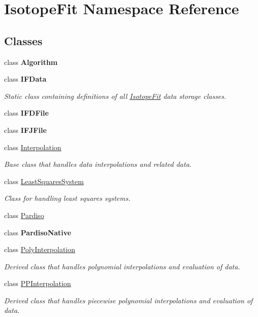 \hypertarget{namespace_isotope_fit}{}\section{Isotope\+Fit Namespace Reference}
\label{namespace_isotope_fit}
\subsection*{Classes}
\begin{DoxyCompactItemize}
\item 
class {\bfseries Algorithm}
\item 
class {\bfseries I\+F\+Data}
\begin{DoxyCompactList}\small\item\em Static class containing definitions of all \hyperlink{namespace_isotope_fit}{Isotope\+Fit} data storage classes. \end{DoxyCompactList}\item 
class {\bfseries I\+F\+D\+File}
\item 
class {\bfseries I\+F\+J\+File}
\item 
class \hyperlink{class_isotope_fit_1_1_interpolation}{Interpolation}
\begin{DoxyCompactList}\small\item\em Base class that handles data interpolations and related data. \end{DoxyCompactList}\item 
class \hyperlink{class_isotope_fit_1_1_least_squares_system}{Least\+Squares\+System}
\begin{DoxyCompactList}\small\item\em Class for handling least squares systems. \end{DoxyCompactList}\item 
class \hyperlink{class_isotope_fit_1_1_pardiso}{Pardiso}
\item 
class {\bfseries Pardiso\+Native}
\item 
class \hyperlink{class_isotope_fit_1_1_poly_interpolation}{Poly\+Interpolation}
\begin{DoxyCompactList}\small\item\em Derived class that handles polynomial interpolations and evaluation of data. \end{DoxyCompactList}\item 
class \hyperlink{class_isotope_fit_1_1_p_p_interpolation}{P\+P\+Interpolation}
\begin{DoxyCompactList}\small\item\em Derived class that handles piecewise polynomial interpolations and evaluation of data. \end{DoxyCompactList}\item 

\end{DoxyCompactItemize}
